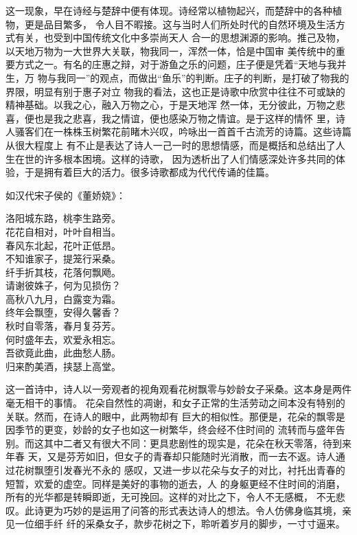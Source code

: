 		这一现象，早在诗经与楚辞中便有体现。诗经常以植物起兴，而楚辞中的各种植物，更是品目繁多，
	令人目不暇接。这与当时人们所处时代的自然环境及生活方式有关，也受到中国传统文化中多崇尚天人
	合一的思想渊源的影响。推己及物，以天地万物为一大世界大关联，物我同一，浑然一体，恰是中国审
	美传统中的重要方式之一。有名的庄惠之辩，对于游鱼之乐的问题，庄子便是凭着“天地与我并生，万
	物与我同一”的观点，而做出“鱼乐”的判断。庄子的判断，是打破了物我的界限，明显有别于惠子对立
	物我的看法，这也正是诗歌中欣赏中往往不可或缺的精神基础。以我之心，融入万物之心，于是天地浑
	然一体，无分彼此，万物之悲喜，便也是我之悲喜，我之情谊，便也感染万物之情谊。是于这样的情怀
	里，诗人骚客们在一株株玉树繁花前睹木兴叹，吟咏出一首首千古流芳的诗篇。这些诗篇从很大程度上
	有不止是表达了诗人一己一时的思想情感，而是概括和总结出了人生在世的许多根本困境。这样的诗歌，
	因为透析出了人们情感深处许多共同的体验，于是拥有着巨大的活力。很多诗歌都成为代代传诵的佳篇。

		如汉代宋子侯的《董娇娆》：

		\shortpoem{}{}{}
			洛阳城东路，桃李生路旁。\\
			花花自相对，叶叶自相当。\\
			春风东北起，花叶正低昂。\\
			不知谁家子，提笼行采桑。\\
			纤手折其枝，花落何飘飏。\\
			请谢彼姝子，何为见损伤？\\
			高秋八九月，白露变为霜。\\
			终年会飘堕，安得久馨香？\\
			秋时自零落，春月复芬芳。\\
			何时盛年去，欢爱永相忘。\\
			吾欲竟此曲，此曲愁人肠。\\
			归来酌美酒，挟瑟上高堂。\\
		\endshortpoem

		这一首诗中，诗人以一旁观者的视角观看花树飘零与妙龄女子采桑。这本身是两件毫无相干的事情。
	花朵自然性的凋谢，和女子正常的生活劳动之间本没有特别的关联。然而，在诗人的眼中，此两物却有
	巨大的相似性。那便是，花朵的飘零是因季节的更变，妙龄的女子也如这一树繁华，终会经不住时间的
	流转而与盛年告别。而这其中二者又有很大不同：更具悲剧性的现实是，花朵在秋天零落，待到来年春
	天，又是芬芳如旧，但女子的青春却只能随时光消散，而一去不返。诗人通过花树飘堕引发春光不永的
	感叹，又进一步以花朵与女子的对比，衬托出青春的短暂，欢爱的虚空。同样是美好的事物的逝去，人
	的身躯更经不住时间的消磨，所有的光华都是转瞬即逝，无可挽回。这样的对比之下，令人不无感概，
	不无悲叹。此诗更为巧妙的是运用了问答的形式表达诗人的想法。令人仿佛身临其境，亲见一位细手纤
	纤的采桑女子，款步花树之下，聆听着岁月的脚步，一寸寸逼来。

